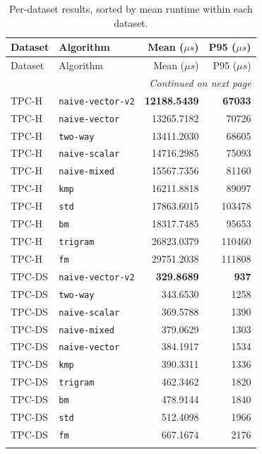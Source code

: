 \documentclass[11pt]{article}
\begin{document}
\small
\begin{longtable}{@{}llrr@{}}
\caption{Per-dataset results, sorted by mean runtime within each dataset.}\label{tab:dataset-all}\\
\toprule
Dataset & Algorithm & Mean (\(\mu s\)) & P95 (\(\mu s\)) \\
\midrule
\endfirsthead
\toprule
Dataset & Algorithm & Mean (\(\mu s\)) & P95 (\(\mu s\)) \\
\midrule
\endhead
\midrule
\multicolumn{4}{r}{\emph{Continued on next page}} \\
\endfoot
\bottomrule
\endlastfoot

TPC-H & \texttt{naive-vector-v2} & \textbf{12188.5439} & \textbf{67033} \\
TPC-H & \texttt{naive-vector}    & 13265.7182          & 70726 \\
TPC-H & \texttt{two-way}         & 13411.2030          & 68605 \\
TPC-H & \texttt{naive-scalar}    & 14716.2985          & 75093 \\
TPC-H & \texttt{naive-mixed}     & 15567.7356          & 81160 \\
TPC-H & \texttt{kmp}             & 16211.8818          & 89097 \\
TPC-H & \texttt{std}             & 17863.6015          & 103478 \\
TPC-H & \texttt{bm}              & 18317.7485          & 95653 \\
TPC-H & \texttt{trigram}         & 26823.0379          & 110460 \\
TPC-H & \texttt{fm}              & 29751.2038          & 111808 \\
\addlinespace

TPC-DS & \texttt{naive-vector-v2} & \textbf{329.8689} & \textbf{937} \\
TPC-DS & \texttt{two-way}         & 343.6530          & 1258 \\
TPC-DS & \texttt{naive-scalar}    & 369.5788          & 1390 \\
TPC-DS & \texttt{naive-mixed}     & 379.0629          & 1303 \\
TPC-DS & \texttt{naive-vector}    & 384.1917          & 1534 \\
TPC-DS & \texttt{kmp}             & 390.3311          & 1336 \\
TPC-DS & \texttt{trigram}         & 462.3462          & 1820 \\
TPC-DS & \texttt{bm}              & 478.9144          & 1840 \\
TPC-DS & \texttt{std}             & 512.4098          & 1966 \\
TPC-DS & \texttt{fm}              & 667.1674          & 2176 \\
\addlinespace


\end{longtable}
\end{document}

